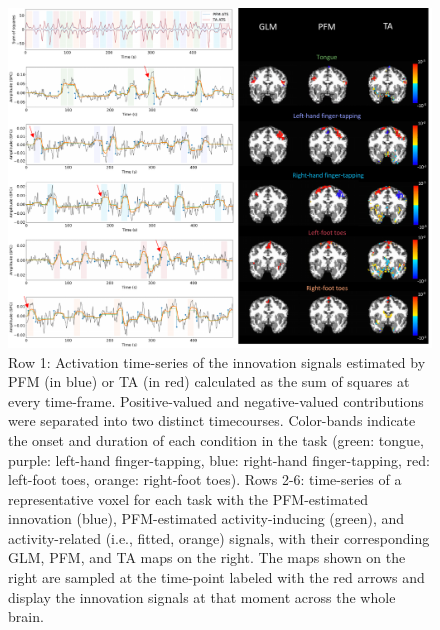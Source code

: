\begin{figure}[t!]
    \begin{center}
        \includegraphics[width=\textwidth]{figures/task_maps.pdf}
    \end{center}
    \caption{Row 1: Activation time-series of the innovation signals estimated by PFM (in blue) or TA (in red) calculated as the sum of squares at every time-frame. Positive-valued and negative-valued contributions were separated into two distinct timecourses. Color-bands indicate the onset and duration of each condition in the task (green: tongue, purple: left-hand finger-tapping, blue: right-hand finger-tapping, red: left-foot toes, orange: right-foot toes). Rows 2-6: time-series of a representative voxel for each task with the PFM-estimated innovation (blue), PFM-estimated activity-inducing (green), and activity-related (i.e., fitted, orange) signals, with their corresponding GLM, PFM, and TA maps on the right. The maps shown on the right are sampled at the time-point labeled with the red arrows and display the innovation signals at that moment across the whole brain.}
\label{fig:task_maps}
\end{figure}

